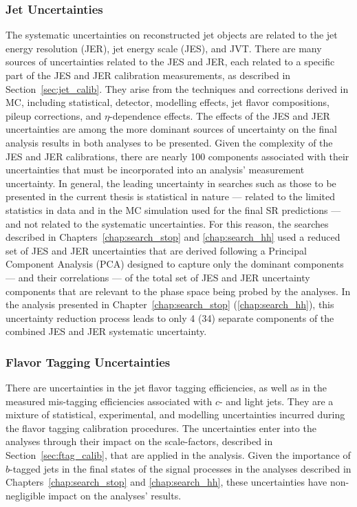 \subsubsection{Jet Uncertainties}
The systematic uncertainties on reconstructed jet objects are related to the jet energy
resolution (JER), jet energy scale (JES), and JVT.
There are many sources of uncertainties related to the JES and JER, each related to a specific
part of the JES and JER calibration measurements, as described in Section~\ref{sec:jet_calib}.
They arise from the techniques and corrections derived in MC, including statistical, detector,
modelling effects, jet flavor compositions, pileup corrections, and $\eta$-dependence effects.
The effects of the JES and JER uncertainties are among the more dominant sources of uncertainty
on the final analysis results in both analyses to be presented.
Given the complexity of the JES and JER calibrations, there are nearly 100 components associated with their uncertainties
that must be incorporated into an analysis' measurement uncertainty.
In general, the leading uncertainty in searches such as those to be presented in the current thesis
is statistical in nature --- related to the limited statistics in data and in the MC simulation used
for the final SR predictions ---  and not related to the systematic uncertainties.
For this reason, the searches described in Chapters~\ref{chap:search_stop} and \ref{chap:search_hh}
used a reduced set of JES and JER uncertainties that are derived following a Principal Component Analysis (PCA)
designed to capture only the dominant components --- and their correlations --- of the total set of JES and JER uncertainty components
that are relevant to the phase space being probed by the analyses.
In the analysis presented in Chapter~\ref{chap:search_stop} (\ref{chap:search_hh}), this uncertainty reduction
process leads to only 4 (34) separate components of the combined JES and JER systematic uncertainty.

\subsubsection{Flavor Tagging Uncertainties}
There are uncertainties in the jet flavor tagging efficiencies, as well as in
the measured mis-tagging efficiencies associated with $c$- and light jets.
They are a mixture of statistical, experimental, and modelling uncertainties
incurred during the flavor tagging calibration procedures.
The uncertainties enter into the analyses through their impact on the scale-factors,
described in Section~\ref{sec:ftag_calib},
that are applied in the analysis.
Given the importance of $b$-tagged jets in the final states of the signal processes
in the analyses described in Chapters~\ref{chap:search_stop} and \ref{chap:search_hh},
these uncertainties have non-negligible impact on the analyses' results.

